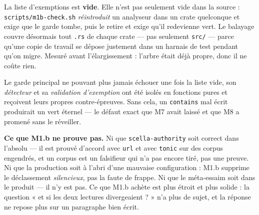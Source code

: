 \documentclass[10pt]{article}
\newcommand{\code}[1]{\texttt{\small #1}}
\begin{document}
La liste d'exemptions est \textbf{vide}. Elle n'est pas seulement vide dans la source :
\code{scripts/m1b-check.sh} \emph{réintroduit} un analyseur dans un crate quelconque et exige que le
garde tombe, puis le retire et exige qu'il redevienne vert. Le balayage couvre désormais tout
\code{.rs} de chaque crate --- pas seulement \code{src/} --- parce qu'une copie de travail se dépose
justement dans un harnais de test pendant qu'on migre. Mesuré avant l'élargissement : l'arbre était
déjà propre, donc il ne coûte rien.

Le garde principal ne pouvant plus jamais échouer une fois la liste vide, son \emph{détecteur} et sa
\emph{validation d'exemption} ont été isolés en fonctions pures et reçoivent leurs propres
contre-épreuves. Sans cela, un \code{contains} mal écrit produirait un vert éternel --- le défaut
exact que M7 avait laissé et que M8 a promené sans le réveiller.

\begin{these}
\textbf{Ce que M1.b ne prouve pas.} Ni que \code{scella-authority} soit correct dans l'absolu --- il
est prouvé d'accord avec \code{url} et avec \code{tonic} sur des corpus engendrés, et un corpus est
un falsifieur qui n'a pas encore tiré, pas une preuve. Ni que la production soit à l'abri d'une
mauvaise configuration : M1.b supprime le déclassement \emph{silencieux}, pas la faute de frappe. Ni
que le méta-essaim soit dans le produit --- il n'y est pas. Ce que M1.b achète est plus étroit et
plus solide : la question « et si les deux lectures divergeaient ? » n'a plus de sujet, et la
réponse ne repose plus sur un paragraphe bien écrit.
\end{these}
\end{document}
